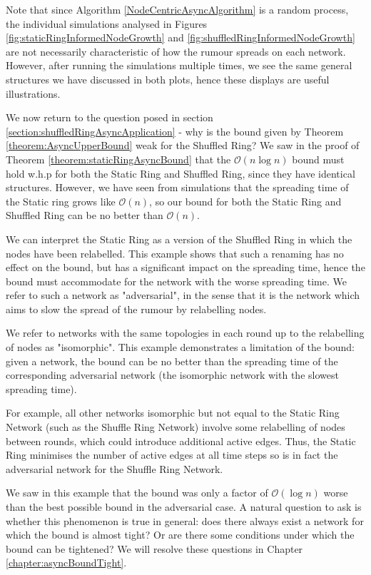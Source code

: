 Note that since Algorithm \ref{NodeCentricAsyncAlgorithm} is a random process, the individual simulations analysed in Figures \ref{fig:staticRingInformedNodeGrowth} and \ref{fig:shuffledRingInformedNodeGrowth} are not necessarily characteristic of how the rumour spreads on each network. However, after running the simulations multiple times, we see the same general structures we have discussed in both plots, hence these displays are useful illustrations.

We now return to the question posed in section \ref{section:shuffledRingAsyncApplication} - why is the bound given by Theorem \ref{theorem:AsyncUpperBound} weak for the Shuffled Ring? We saw in the proof of Theorem \ref{theorem:staticRingAsyncBound} that the $\mathcal{O}(n \log n)$ bound must hold w.h.p for both the Static Ring and Shuffled Ring, since they have identical structures. However, we have seen from simulations that the spreading time of the Static ring grows like $\mathcal{O}(n)$, so our bound for both the Static Ring and Shuffled Ring can be no better than $\mathcal{O}(n)$. 

We can interpret the Static Ring as a version of the Shuffled Ring in which the nodes have been relabelled. This example shows that such a renaming has no effect on the bound, but has a significant impact on the spreading time, hence the bound must accommodate for the network with the worse spreading time. We refer to such a network as "adversarial", in the sense that it is the network which aims to slow the spread of the rumour by relabelling nodes.

We refer to networks with the same topologies in each round up to the relabelling of nodes as "isomorphic". This example demonstrates a limitation of the bound: given a network, the bound can be no better than the spreading time of the corresponding adversarial network (the isomorphic network with the slowest spreading time).

For example, all other networks isomorphic but not equal to the Static Ring Network (such as the Shuffle Ring Network) involve some relabelling of nodes between rounds, which could introduce additional active edges. Thus, the Static Ring minimises the number of active edges at all time steps so is in fact the adversarial network for the Shuffle Ring Network. 

We saw in this example that the bound was only a factor of $\mathcal{O}(\log n)$ worse than the best possible bound in the adversarial case.  A natural question to ask is whether this phenomenon is true in general: does there always exist a network for which the bound is almost tight? Or are there some conditions under which the bound can be tightened? We will resolve these questions in Chapter \ref{chapter:asyncBoundTight}.


